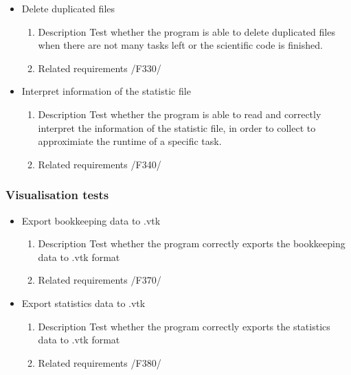{\begin{itemize}
				\item Delete duplicated files 
				\begin{enumerate}
					\item Description\newline
Test whether the program is able to delete duplicated files when there are not many tasks left or the scientific code is finished.
					\item Related requirements\newline
					/F330/
				\end{enumerate}
				
				
				
				\item Interpret information of the statistic file
				\begin{enumerate}
					\item Description\newline
Test whether the program is able to read and correctly interpret the information of the statistic file, in order to collect to approximiate the runtime of a specific task.
					\item Related requirements\newline
					/F340/
				\end{enumerate}
				
		\end{itemize}		
		\subsubsection{Visualisation tests}
		\begin{itemize}
		
				\item Export bookkeeping data to .vtk
				\begin{enumerate}
					\item Description\newline
Test whether the program correctly exports the bookkeeping data to .vtk format
					\item Related requirements\newline
					/F370/
				\end{enumerate}
				
		
				\item Export statistics data to .vtk
				\begin{enumerate}
					\item Description\newline
Test whether the program correctly exports the statistics data to .vtk format
					\item Related requirements\newline
					/F380/
				\end{enumerate}
				

\end{itemize}}
